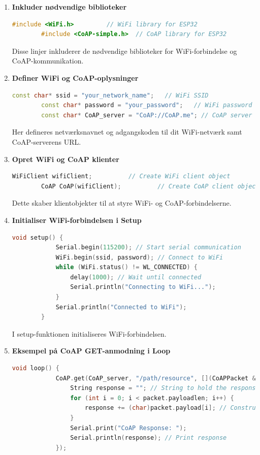 \begin{enumerate}
	\item \textbf{Inkluder nødvendige biblioteker}
	\begin{lstlisting}[language=C++, caption=Syntaks]
		#include <WiFi.h>         // WiFi library for ESP32
		#include <CoAP-simple.h>  // CoAP library for ESP32
	\end{lstlisting}
	\noindent Disse linjer inkluderer de nødvendige biblioteker for WiFi-forbindelse og CoAP-kommunikation.
	
	\item \textbf{Definer WiFi og CoAP-oplysninger}
	\begin{lstlisting}[language=C++, caption=Syntaks]
		const char* ssid = "your_network_name";   // WiFi SSID
		const char* password = "your_password";   // WiFi password
		const char* CoAP_server = "CoAP://CoAP.me"; // CoAP server URL
	\end{lstlisting}
	\noindent Her defineres netværksnavnet og adgangskoden til dit WiFi-netværk samt CoAP-serverens URL.
	
	\item \textbf{Opret WiFi og CoAP klienter}
	\begin{lstlisting}[language=C++, caption=Syntaks]
		WiFiClient wifiClient;          // Create WiFi client object
		CoAP CoAP(wifiClient);          // Create CoAP client object
	\end{lstlisting}
	\noindent Dette skaber klientobjekter til at styre WiFi- og CoAP-forbindelserne.
	
	\item \textbf{Initialiser WiFi-forbindelsen i Setup}
	\begin{lstlisting}[language=C++, caption=Syntaks]
		void setup() {
			Serial.begin(115200); // Start serial communication
			WiFi.begin(ssid, password); // Connect to WiFi
			while (WiFi.status() != WL_CONNECTED) {
				delay(1000); // Wait until connected
				Serial.println("Connecting to WiFi...");
			}
			Serial.println("Connected to WiFi");
		}
	\end{lstlisting}
	\noindent I setup-funktionen initialiseres WiFi-forbindelsen.
	
	\item \textbf{Eksempel på CoAP GET-anmodning i Loop}
	\begin{lstlisting}[language=C++, caption=Syntaks]
		void loop() {
			CoAP.get(CoAP_server, "/path/resource", [](CoAPPacket &packet, IPAddress ip, int port) {
				String response = ""; // String to hold the response
				for (int i = 0; i < packet.payloadlen; i++) {
					response += (char)packet.payload[i]; // Construct response string
				}
				Serial.print("CoAP Response: ");
				Serial.println(response); // Print response
			});
			

\end{lstlisting}
\end{enumerate}
